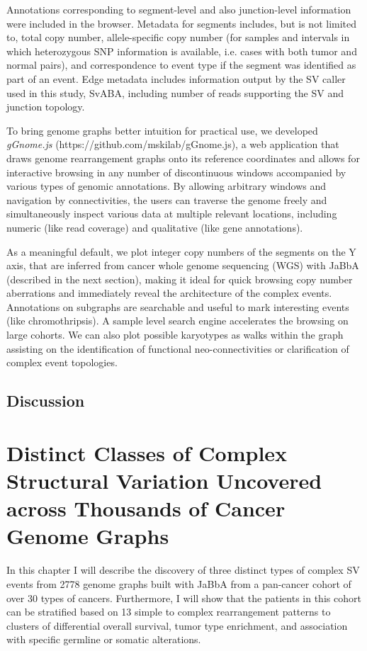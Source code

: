 \documentclass[phd,tocprelim]{cornell}
\begin{document}
Annotations corresponding to segment-level and also junction-level information were included in the browser. Metadata for segments includes, but is not limited to, total copy number, allele-specific copy number (for samples and intervals in which heterozygous SNP information is available, i.e. cases with both tumor and normal pairs), and correspondence to event type if the segment was identified as part of an event. Edge metadata includes information output by the SV caller used in this study, SvABA, including number of reads supporting the SV and junction topology.

To bring genome graphs better intuition for practical use, we developed \textit{gGnome.js} (https://github.com/mskilab/gGnome.js), a web application that draws genome rearrangement graphs onto its reference coordinates and allows for interactive browsing in any number of discontinuous windows accompanied by various types of genomic annotations. By allowing arbitrary windows and navigation by connectivities, the users can traverse the genome freely and simultaneously inspect various data at multiple relevant locations, including numeric (like read coverage) and qualitative (like gene annotations).


As a meaningful default, we plot integer copy numbers of the segments on the Y axis, that are inferred from cancer whole genome sequencing (WGS) with JaBbA (described in the next section), making it ideal for quick browsing copy number aberrations and immediately reveal the architecture of the complex events. Annotations on subgraphs are searchable and useful to mark interesting events (like chromothripsis). A sample level search engine accelerates the browsing on large cohorts. We can also plot possible karyotypes as walks within the graph assisting on the identification of functional neo-connectivities or clarification of complex event topologies.

\section{Discussion}

\chapter{Distinct Classes of Complex Structural Variation Uncovered across Thousands of Cancer Genome Graphs}
In this chapter I will describe the discovery of three distinct types of complex SV events from 2778 genome graphs built with JaBbA from a pan-cancer cohort of over 30 types of cancers. Furthermore, I will show that the patients in this cohort can be stratified based on 13 simple to complex rearrangement patterns to clusters of differential overall survival, tumor type enrichment, and association with specific germline or somatic alterations.
\end{document}
